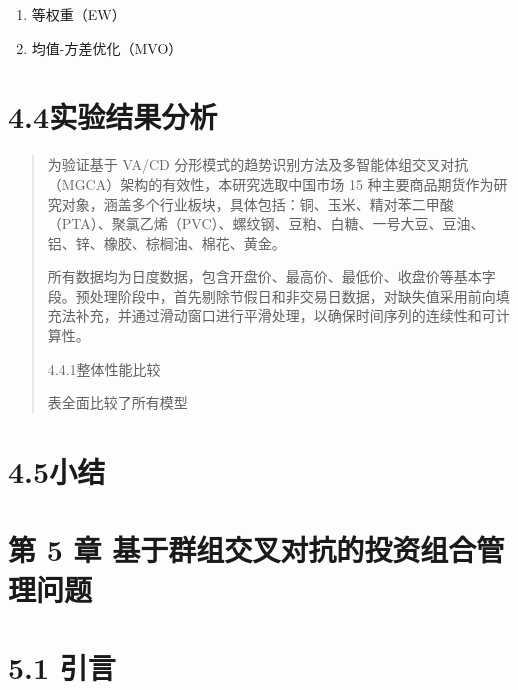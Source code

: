 \documentclass[UTF8]{ctexart}
\begin{document}
\begin{enumerate}
\def\labelenumi{\arabic{enumi}.}
\item
  等权重（EW）
\item
  均值-方差优化（MVO）
\end{enumerate}

\section{4.4实验结果分析}\label{ux5b9eux9a8cux7ed3ux679cux5206ux6790}

\begin{quote}
为验证基于 VA/CD
分形模式的趋势识别方法及多智能体组交叉对抗（MGCA）架构的有效性，本研究选取中国市场
15
种主要商品期货作为研究对象，涵盖多个行业板块，具体包括：铜、玉米、精对苯二甲酸（PTA）、聚氯乙烯（PVC）、螺纹钢、豆粕、白糖、一号大豆、豆油、铝、锌、橡胶、棕榈油、棉花、黄金。

所有数据均为日度数据，包含开盘价、最高价、最低价、收盘价等基本字段。预处理阶段中，首先剔除节假日和非交易日数据，对缺失值采用前向填充法补充，并通过滑动窗口进行平滑处理，以确保时间序列的连续性和可计算性。

4.4.1整体性能比较

表全面比较了所有模型
\end{quote}

\section{4.5小结}\label{ux5c0fux7ed3-1}

\section{第 5 章
基于群组交叉对抗的投资组合管理问题}\label{ux7b2c-5-ux7ae0-ux57faux4e8eux7fa4ux7ec4ux4ea4ux53c9ux5bf9ux6297ux7684ux6295ux8d44ux7ec4ux5408ux7ba1ux7406ux95eeux9898}

\section{5.1 引言}\label{ux5f15ux8a00-2}
\end{document}
